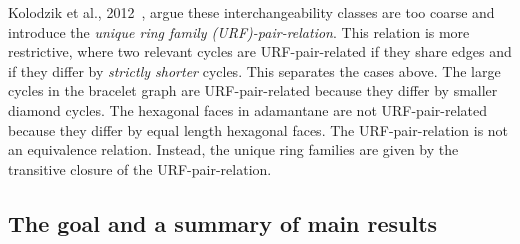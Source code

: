 \documentclass[fleqn,11pt]{article}
\begin{document}
Kolodzik {et al.}, 2012~\cite{kolodzikUnique2012}, argue these interchangeability classes are too coarse and introduce the \emph{unique ring family (URF)-pair-relation}. This relation is more restrictive, where two relevant cycles are URF-pair-related if they share edges and if they differ by \emph{strictly shorter} cycles. This separates the cases above. The large cycles in the bracelet graph are URF-pair-related because they differ by smaller diamond cycles. The hexagonal faces in adamantane are not URF-pair-related because they differ by equal length hexagonal faces. The URF-pair-relation is not an equivalence relation. Instead, the unique ring families are given by the transitive closure of the URF-pair-relation.

\subsection{The goal and a summary of main results}
\end{document}
